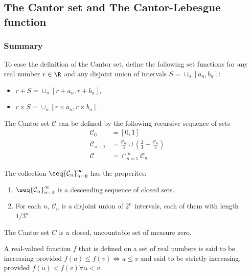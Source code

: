 \newcommand{\cantor}{\mathcal{C}}
\newcommand{\Ocal}{\mathcal{O}}
\newcommand{\union}{\cup}
\newcommand{\intersect}{\cap}


\subsection{The Cantor set and The Cantor-Lebesgue function}
\subsubsection{Summary}

\noindent To ease the definition of the Cantor set, define the following set functions 
for any real number $r\in \R$ and any disjoint union of intervals $S = \union_n [a_n, b_n]$:
\begin{itemize}
    \item $r + S = \union_n \left[r+a_n, r+b_n\right]$,
    \item $r\times S = \union_n \left[r\times a_n, r\times b_n\right]$.
\end{itemize}

\begin{defn}
    The Cantor set $\cantor$ can be defined by the following recursive sequence of sets
    \begin{align}
        \cantor_0 &= [0,1] \\
        \cantor_{n+1} &= \frac{\cantor_n}{3} \union \left(\frac{2}{3} + \frac{\cantor_n}{3}\right) \\
        \cantor &= \intersect_{n=1}^{\infty} \cantor_n
    \end{align}
\end{defn}

\noindent The collection $\seq{\cantor_n}_{n=0}^{\infty}$ has the properites:
\begin{enumerate}[label=(\roman*)]
    \item $\seq{\cantor_n}_{n=0}^{\infty}$ is a descending sequence of closed sets.
    \item For each $n$, $\cantor_{n}$ is a disjoint union of $2^n$ intervals, each of them with length $1/3^n$.
\end{enumerate}

\begin{thm}
    The Cantor set $C$ is a closed, uncountable set of measure zero.
\end{thm}


\noindent A real-valued function $f$ that is defined on a set of real numbers is said to be
increasing provided $f(u) \leq f(v) \iff u \leq v$ and said to be strictly increasing, provided
$f(u) < f(v) \forall u < v$.


